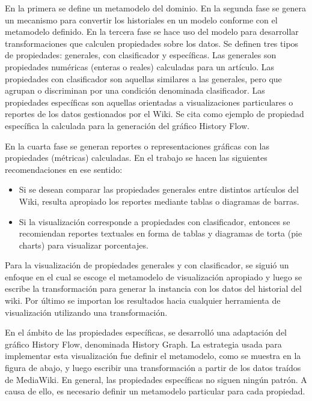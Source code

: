 En la primera se define un metamodelo del dominio. En la segunda fase se genera un mecanismo para convertir los historiales en un modelo conforme con el metamodelo definido. En la tercera fase se hace uso del modelo para desarrollar transformaciones que  calculen propiedades sobre los datos. Se definen tres tipos de propiedades: generales, con clasificador y específicas. Las generales son propiedades numéricas (enteras o reales) calculadas para un artículo. Las propiedades con clasificador son aquellas similares a las generales, pero que agrupan o discriminan por una condición denominada clasificador. Las propiedades específicas son aquellas orientadas a visualizaciones particulares o reportes de los datos gestionados por el Wiki. Se cita como ejemplo de propiedad específica la calculada para la generación del gráfico History Flow.

En la cuarta fase se generan reportes o representaciones gráficas con las propiedades (métricas) calculadas. En el trabajo se hacen las siguientes recomendaciones en ese sentido:

\begin{itemize}
  \item Si se desean comparar las propiedades generales entre distintos artículos del Wiki, resulta apropiado los reportes mediante tablas o diagramas de barras.
  \item Si la visualización corresponde a propiedades con clasificador, entonces se recomiendan reportes textuales en forma de tablas y diagramas de torta (pie charts) para visualizar porcentajes.
\end{itemize}

Para la visualización de propiedades generales y con clasificador, se siguió un enfoque en el cual se escoge el metamodelo de visualización apropiado y luego se escribe la transformación para generar la instancia con los datos del historial del wiki. Por último se importan los resultados hacia cualquier herramienta de visualización utilizando una transformación.

En el ámbito de las propiedades específicas, se desarrolló una adaptación del gráfico History Flow, denominada History Graph. La estrategia usada para implementar esta visualización fue definir el metamodelo, como se muestra en la figura de abajo, y luego escribir una transformación a partir de los datos traídos de MediaWiki. En general, las propiedades específicas no siguen ningún patrón. A causa de ello, es necesario definir un metamodelo particular para cada propiedad.

